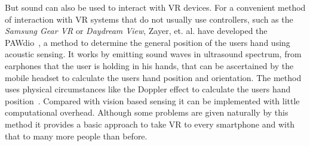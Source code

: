 But sound can also be used to interact with VR devices. For a convenient method of interaction with VR systems that do not usually use controllers, such as the \textit{Samsung Gear VR} or \textit{Daydream View}, Zayer, et. al. have developed the PAWdio~\cite{Zayer:2016:PHI:2967934.2968079}, a method to determine the general position of the users hand using acoustic sensing. It works by emitting sound waves in ultrasound spectrum, from earphones that the user is holding in his hands, that can be ascertained by the mobile headset to calculate the users hand position and orientation. The method uses physical circumstances like the Doppler effect to calculate the users hand position~\cite{Zayer:2016:PHI:2967934.2968079}. Compared with vision based sensing it can be implemented with little computational overhead. \newline
Although some problems are given naturally by this method it provides a basic approach to take VR to every smartphone and with that to many more people than before.


